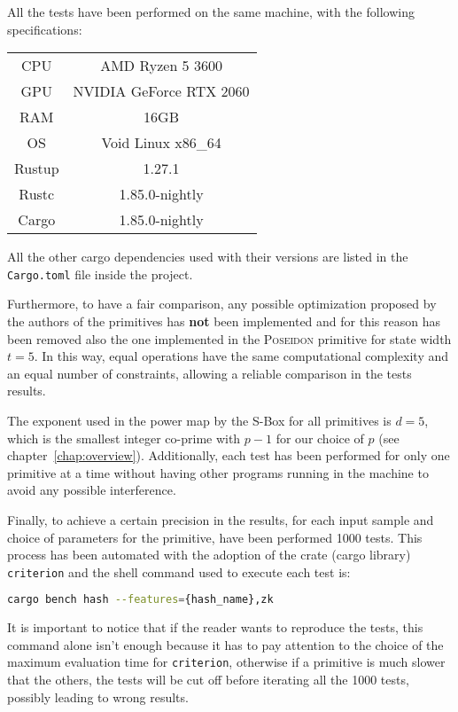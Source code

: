 \documentclass[12pt, a4paper]{report}
\begin{document}
All the tests have been performed on the same machine, with the following specifications:
\begin{table}[H]
    \centering
    \begin{tabular}{|c||c|}
      \hline
        CPU & AMD Ryzen 5 3600 \\
        GPU & NVIDIA GeForce RTX 2060 \\
        RAM & 16GB \\
        OS & Void Linux x86\_64 \\
        \hline
        Rustup & 1.27.1 \\
        Rustc & 1.85.0-nightly \\
        Cargo & 1.85.0-nightly \\
      \hline
    \end{tabular}
    \label{tab:machinespecs}
\end{table}
All the other cargo dependencies used with their versions are listed in the \texttt{Cargo.toml} file inside the project.

Furthermore, to have a fair comparison, any possible optimization proposed by the authors of the primitives has \textbf{not} been implemented and for this reason has been removed also the one implemented in the \textsc{Poseidon} primitive for state width $t = 5$.
In this way, equal operations have the same computational complexity and an equal number of constraints, allowing a reliable comparison in the tests results.

The exponent used in the power map by the S-Box for all primitives is $d = 5$, which is the smallest integer co-prime with $p-1$ for our choice of $p$ (see chapter~\ref{chap:overview}).
Additionally, each test has been performed for only one primitive at a time without having other programs running in the machine to avoid any possible interference.

Finally, to achieve a certain precision in the results, for each input sample and choice of parameters for the primitive, have been performed 1000 tests.
This process has been automated with the adoption of the crate (cargo library) \texttt{criterion} and the shell command used to execute each test is:
\begin{lstlisting}[language=bash]
  cargo bench hash --features={hash_name},zk
\end{lstlisting}
It is important to notice that if the reader wants to reproduce the tests, this command alone isn't enough because it has to pay attention to the choice of the maximum evaluation time for \texttt{criterion}, otherwise if a primitive is much slower that the others, the tests will be cut off before iterating all the 1000 tests, possibly leading to wrong results.
\end{document}
